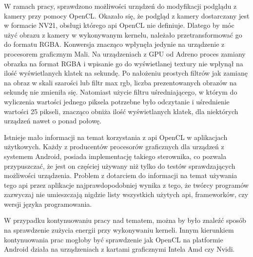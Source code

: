 W ramach pracy, sprawdzono możliwości urządzeń do modyfikacji podglądu z kamery przy pomocy OpenCL. Okazało się, że podgląd z kamery dostarczany jest w formacie NV21, obsługi którego api OpenCL nie definiuje. Dlatego by móc użyć obrazu z kamery w wykonywanym kernelu, należało przetransformować go do formatu RGBA. Konwersja znacząco wpłynęła jedynie na urządzenie z procesorem graficznym Mali. Na urządzeniach z GPU od Adreno proces zamiany obrazka na format RGBA i wpisanie go do wyświetlanej textury nie wpłynął na ilość wyświetlanych klatek na sekundę. Po nałożeniu prostych filtrów jak zamianę na obraz w skali szarości lub filtr max rgb, liczba prezentowanych obrazów na sekundę nie zmieniła się. Natomiast użycie filtru uśredniającego, w którym do wyliczenia wartości jednego piksela potrzebne było odczytanie i uśrednienie wartości 25 pikseli, znacząco obniża ilość wyświetlanych klatek, dla niektórych urządzeń nawet o ponad połowę.

Istnieje mało informacji na temat korzystania z api OpenCL w aplikacjach użytkowych. Każdy z producentów procesorów graficznych dla urządzeń z systemem Android, posiada implementację takiego sterownika, co pozwala przypuszczać, że jest on częściej używany niż tylko do testów sprawdzających możliwości urządzenia. Problem z dotarciem do informacji na temat używania tego api przez aplikacje najprawdopodobniej wynika z tego, że twórcy programów zazwyczaj nie umieszczają nigdzie listy wszystkich użytych api, frameworków, czy wersji języka programowania.

W przypadku kontynuowaniu pracy nad tematem, można by było znaleźć sposób na sprawdzenie zużycia energii przy wykonywaniu kerneli. Innym kierunkiem kontynuowania prac mogłoby być sprawdzenie jak OpenCL na platformie Android działa na urządzeniach z kartami graficznymi Intela Amd czy Nvidi.
